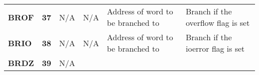\documentclass[]{article}
\begin{document}
\begin{longtable}[c]{@{}llllll@{}}
\begin{minipage}[t]{0.14\columnwidth}
\textbf{BROF}
\strut\end{minipage} &
\begin{minipage}[t]{0.14\columnwidth}\raggedright\strut
\textbf{37}
\strut\end{minipage} &
\begin{minipage}[t]{0.14\columnwidth}\raggedright\strut
N/A
\strut\end{minipage} &
\begin{minipage}[t]{0.14\columnwidth}\raggedright\strut
N/A
\strut\end{minipage} &
\begin{minipage}[t]{0.14\columnwidth}\raggedright\strut
Address of word to be branched to
\strut\end{minipage} &
\begin{minipage}[t]{0.14\columnwidth}\raggedright\strut
Branch if the overflow flag is set
\strut\end{minipage}\tabularnewline
\begin{minipage}[t]{0.14\columnwidth}\raggedright\strut
\textbf{BRIO}
\strut\end{minipage} &
\begin{minipage}[t]{0.14\columnwidth}\raggedright\strut
\textbf{38}
\strut\end{minipage} &
\begin{minipage}[t]{0.14\columnwidth}\raggedright\strut
N/A
\strut\end{minipage} &
\begin{minipage}[t]{0.14\columnwidth}\raggedright\strut
N/A
\strut\end{minipage} &
\begin{minipage}[t]{0.14\columnwidth}\raggedright\strut
Address of word to be branched to
\strut\end{minipage} &
\begin{minipage}[t]{0.14\columnwidth}\raggedright\strut
Branch if the ioerror flag is set
\strut\end{minipage}\tabularnewline
\begin{minipage}[t]{0.14\columnwidth}\raggedright\strut
\textbf{BRDZ}
\strut\end{minipage} &
\begin{minipage}[t]{0.14\columnwidth}\raggedright\strut
\textbf{39}
\strut\end{minipage} &
\begin{minipage}[t]{0.14\columnwidth}\raggedright\strut
N/A
\strut\end{minipage} &
\begin{minipage}[t]{0.14\columnwidth}\raggedright\strut

\end{minipage}
\end{longtable}
\end{document}
